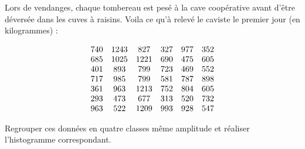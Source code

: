 
\begin{exercice}\label{exo2smath-0308}

Lors de vendanges, chaque tombereau est pesé à la cave coopérative avant d'être déversée dans les cuves à raisins. Voila ce qu'à relevé le caviste le premier jour (en kilogrammes) :

\begin{equation*}
    \begin{array}[]{cccccc}
        740&1243&827&327&977&352\\
        685&1025&1221&690&475&605\\
        401&893&799&723&469&552\\
        717&985&799&581&787&898\\
        361&963&1213&752&804&605\\
        293&473&677&313&520&732\\
        963&522&1209&993&928&547
    \end{array}
\end{equation*}

Regrouper ces données en quatre classes même amplitude et réaliser l'histogramme correspondant.

\end{exercice}
